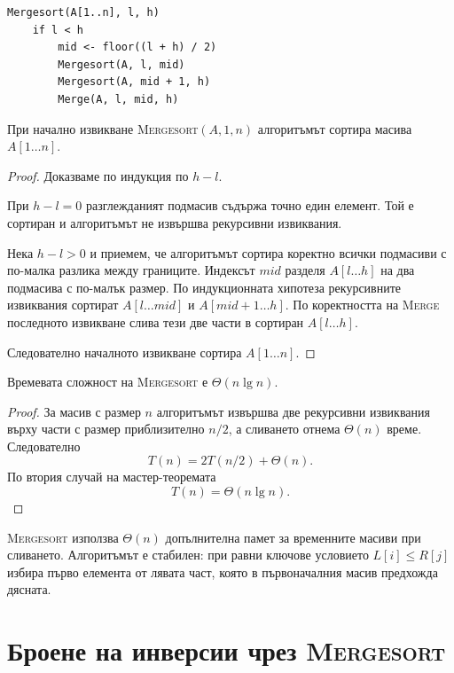 \begin{verbatim}
Mergesort(A[1..n], l, h)
    if l < h
        mid <- floor((l + h) / 2)
        Mergesort(A, l, mid)
        Mergesort(A, mid + 1, h)
        Merge(A, l, mid, h)
\end{verbatim}

\begin{thm}
При начално извикване \textsc{Mergesort}$(A,1,n)$ алгоритъмът сортира масива $A[1\ldots n]$.
\end{thm}

\begin{proof}
Доказваме по индукция по $h-l$.

При $h-l=0$ разглежданият подмасив съдържа точно един елемент. Той е сортиран и алгоритъмът не извършва рекурсивни извиквания.

Нека $h-l>0$ и приемем, че алгоритъмът сортира коректно всички подмасиви с по-малка разлика между границите. Индексът $mid$ разделя $A[l\ldots h]$ на два подмасива с по-малък размер. По индукционната хипотеза рекурсивните извиквания сортират $A[l\ldots mid]$ и $A[mid+1\ldots h]$. По коректността на \textsc{Merge} последното извикване слива тези две части в сортиран $A[l\ldots h]$.

Следователно началното извикване сортира $A[1\ldots n]$.
\end{proof}

\begin{thm}
Времевата сложност на \textsc{Mergesort} е $\Theta(n\lg n)$.
\end{thm}

\begin{proof}
За масив с размер $n$ алгоритъмът извършва две рекурсивни извиквания върху части с размер приблизително $n/2$, а сливането отнема $\Theta(n)$ време. Следователно
\[
T(n)=2T(n/2)+\Theta(n).
\]
По втория случай на мастер-теоремата
\[
T(n)=\Theta(n\lg n).
\]
\end{proof}

\begin{remark}
\textsc{Mergesort} използва $\Theta(n)$ допълнителна памет за временните масиви при сливането. Алгоритъмът е стабилен: при равни ключове условието $L[i]\leq R[j]$ избира първо елемента от лявата част, която в първоначалния масив предхожда дясната.
\end{remark}

\section{Броене на инверсии чрез \textsc{Mergesort}}\label{s:6.7}

